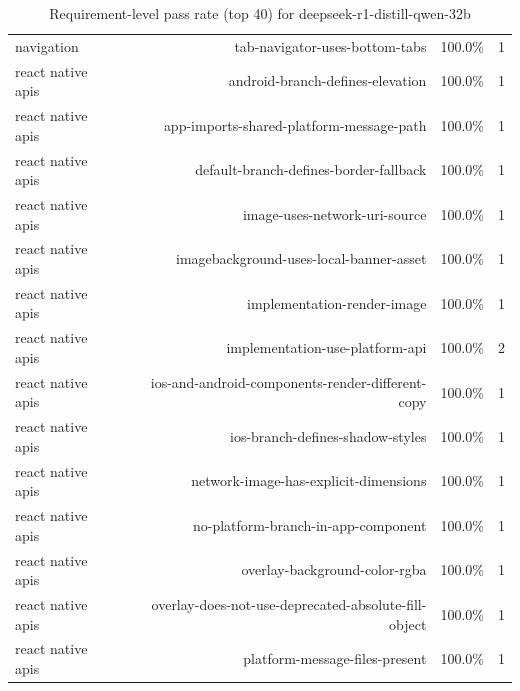 \begin{table}[htbp]
\begin{tabular}{lrrr}
navigation & tab-navigator-uses-bottom-tabs & 100.0\% & 1 \\
react native apis & android-branch-defines-elevation & 100.0\% & 1 \\
react native apis & app-imports-shared-platform-message-path & 100.0\% & 1 \\
react native apis & default-branch-defines-border-fallback & 100.0\% & 1 \\
react native apis & image-uses-network-uri-source & 100.0\% & 1 \\
react native apis & imagebackground-uses-local-banner-asset & 100.0\% & 1 \\
react native apis & implementation-render-image & 100.0\% & 1 \\
react native apis & implementation-use-platform-api & 100.0\% & 2 \\
react native apis & ios-and-android-components-render-different-copy & 100.0\% & 1 \\
react native apis & ios-branch-defines-shadow-styles & 100.0\% & 1 \\
react native apis & network-image-has-explicit-dimensions & 100.0\% & 1 \\
react native apis & no-platform-branch-in-app-component & 100.0\% & 1 \\
react native apis & overlay-background-color-rgba & 100.0\% & 1 \\
react native apis & overlay-does-not-use-deprecated-absolute-fill-object & 100.0\% & 1 \\
react native apis & platform-message-files-present & 100.0\% & 1 \\
\bottomrule
\end{tabular}
\caption{Requirement-level pass rate (top 40) for deepseek-r1-distill-qwen-32b}
\end{table}
